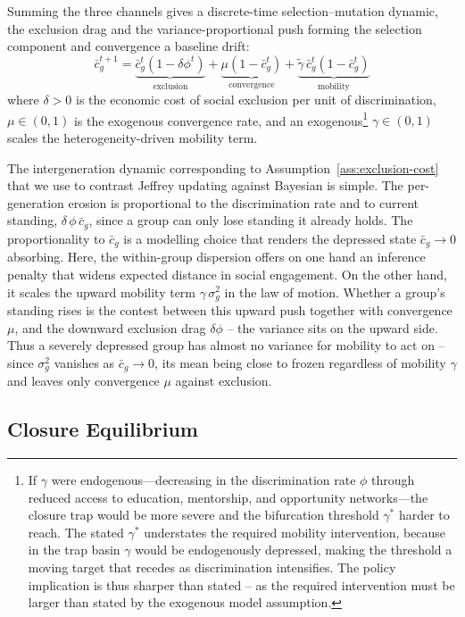 \documentclass[pdflatex,sn-basic]{sn-jnl}
\theoremstyle{thmstyleone}
\numberwithin{proposition}{subsection}
\begin{document}
Summing the three channels gives a discrete-time selection--mutation
dynamic, the exclusion drag and the variance-proportional push forming
the selection component and convergence a baseline drift:
\begin{equation}
  \bar{c}_g^{t+1} =
  \underbrace{\bar{c}_g^t(1 - \delta \phi^t)}_{\text{exclusion}}
  + \underbrace{\mu(1 - \bar{c}_g^t)}_{\text{convergence}}
  + \underbrace{\tilde{\gamma}\,\bar{c}_g^t(1-\bar{c}_g^t)}_{\text{mobility}}
  \label{eq:dynamic}
\end{equation}
where $\delta > 0$ is the economic cost of social exclusion per unit of
discrimination, $\mu \in (0,1)$ is the
exogenous convergence rate, and an exogenous\footnote{If $\gamma$ were endogenous---decreasing in
the discrimination rate $\phi$ through reduced access to education,
mentorship, and opportunity networks---the closure trap would be more
severe and the bifurcation threshold $\gamma^*$ harder to reach. The stated $\gamma^*$ understates the required mobility intervention, because in the trap basin
$\gamma$ would be endogenously depressed, making the threshold
a moving target that recedes as discrimination intensifies. The policy implication is thus sharper than stated -- as the
required intervention must be larger than stated by the exogenous model assumption.} $\gamma \in (0,1)$ scales the
heterogeneity-driven mobility term.

The intergeneration dynamic corresponding to Assumption~\ref{ass:exclusion-cost} that we use to contrast Jeffrey updating against Bayesian is simple. The per-generation erosion is
proportional to the discrimination rate and to current standing,
$\delta\,\phi\,\bar{c}_g$, since a group can only lose standing it already
holds. The proportionality to $\bar{c}_g$ is a modelling choice that renders the
depressed state $\bar{c}_g \to 0$ absorbing. Here, the within-group dispersion offers on one hand an inference penalty that widens expected
distance in social engagement. On the other hand, it scales the
upward mobility term $\gamma\,\sigma_g^2$  in the law of motion. Whether
a group's standing rises is the contest between this upward push together
with convergence $\mu$, and the downward exclusion drag $\delta\phi$ --
the variance sits on the upward side. Thus a severely depressed group has
almost no variance for mobility to act on -- since $\sigma_g^2$ vanishes as $\bar{c}_g \to 0$, its mean being close to frozen regardless of mobility $\gamma$ and leaves only convergence $\mu$ against exclusion.

\subsection{Closure Equilibrium}
\end{document}
